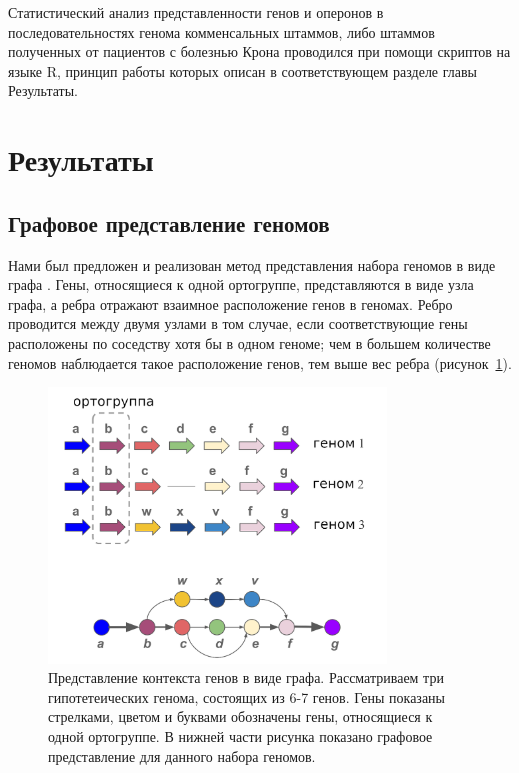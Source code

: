 Статистический анализ представленности генов и оперонов в последовательностях генома комменсальных штаммов, либо штаммов полученных от пациентов с болезнью Крона проводился при помощи скриптов на языке R, принцип работы которых описан в соответствующем разделе главы Результаты.


\section*{Результаты}

\subsection*{Графовое представление геномов}

Нами был предложен и реализован метод представления набора геномов в виде графа \cite{manolov2020genome}. Гены, относящиеся к одной ортогруппе, представляются в виде узла графа, а ребра отражают взаимное расположение генов в геномах. Ребро проводится между двумя узлами в том случае, если соответствующие гены расположены по соседству хотя бы в одном геноме; чем в большем количестве геномов наблюдается такое расположение генов, тем выше вес ребра (рисунок~\ref{img:scheme}).

\begin{figure}[!ht] 
  \center
    \includegraphics[width=0.8\textwidth]{Dissertation/images/graph/graph_scheme.png}
  \caption{Представление контекста генов в виде графа. Рассматриваем три гипотетеических генома, состоящих из 6-7 генов. Гены показаны стрелками, цветом и буквами обозначены гены, относящиеся к одной ортогруппе. В нижней части рисунка показано графовое представление для данного набора геномов.}
  \label{img:scheme} 
\end{figure}

